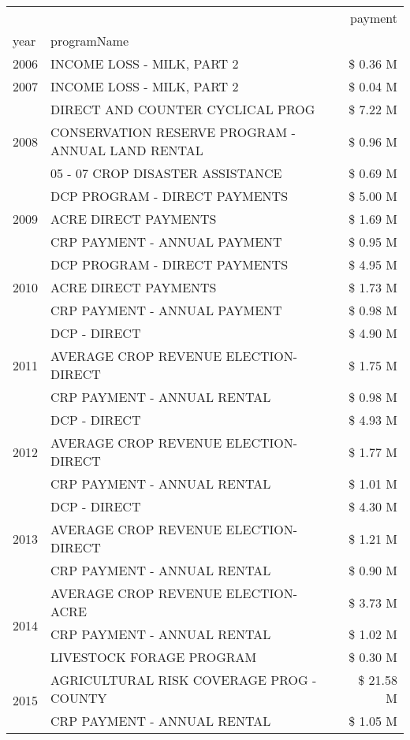 \begin{tabular}{llr}
\toprule
 &  & payment \\
year & programName &  \\
\midrule
2006 & INCOME LOSS - MILK, PART 2 & \$ 0.36 M \\
\cline{1-3}
2007 & INCOME LOSS - MILK, PART 2 & \$ 0.04 M \\
\cline{1-3}
\multirow[t]{3}{*}{2008} & DIRECT AND COUNTER CYCLICAL PROG & \$ 7.22 M \\
 & CONSERVATION RESERVE PROGRAM - ANNUAL LAND RENTAL & \$ 0.96 M \\
 & 05 - 07 CROP DISASTER ASSISTANCE & \$ 0.69 M \\
\cline{1-3}
\multirow[t]{3}{*}{2009} & DCP PROGRAM - DIRECT PAYMENTS & \$ 5.00 M \\
 & ACRE DIRECT PAYMENTS & \$ 1.69 M \\
 & CRP PAYMENT - ANNUAL PAYMENT & \$ 0.95 M \\
\cline{1-3}
\multirow[t]{3}{*}{2010} & DCP PROGRAM - DIRECT PAYMENTS & \$ 4.95 M \\
 & ACRE DIRECT PAYMENTS & \$ 1.73 M \\
 & CRP PAYMENT - ANNUAL PAYMENT & \$ 0.98 M \\
\cline{1-3}
\multirow[t]{3}{*}{2011} & DCP - DIRECT & \$ 4.90 M \\
 & AVERAGE CROP REVENUE ELECTION-DIRECT & \$ 1.75 M \\
 & CRP PAYMENT - ANNUAL RENTAL & \$ 0.98 M \\
\cline{1-3}
\multirow[t]{3}{*}{2012} & DCP - DIRECT & \$ 4.93 M \\
 & AVERAGE CROP REVENUE ELECTION-DIRECT & \$ 1.77 M \\
 & CRP PAYMENT - ANNUAL RENTAL & \$ 1.01 M \\
\cline{1-3}
\multirow[t]{3}{*}{2013} & DCP - DIRECT & \$ 4.30 M \\
 & AVERAGE CROP REVENUE ELECTION-DIRECT & \$ 1.21 M \\
 & CRP PAYMENT - ANNUAL RENTAL & \$ 0.90 M \\
\cline{1-3}
\multirow[t]{3}{*}{2014} & AVERAGE CROP REVENUE ELECTION-ACRE & \$ 3.73 M \\
 & CRP PAYMENT - ANNUAL RENTAL & \$ 1.02 M \\
 & LIVESTOCK FORAGE PROGRAM & \$ 0.30 M \\
\cline{1-3}
\multirow[t]{3}{*}{2015} & AGRICULTURAL RISK COVERAGE PROG - COUNTY & \$ 21.58 M \\
 & CRP PAYMENT - ANNUAL RENTAL & \$ 1.05 M \\

\end{tabular}
